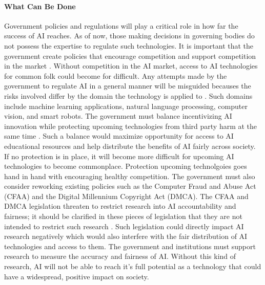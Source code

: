 \documentclass[12pt]{article}
\begin{document}
\paragraph{What Can Be Done\\}
Government policies and regulations will play a critical role in how far the success of AI reaches. As of now, those making decisions in governing bodies do not possess the expertise to regulate such technologies. It is important that the government create policies that encourage competition and support competition in the market \cite{gov}. Without competition in the AI market, access to AI technologies for common folk could become for difficult. Any attempts made by the government to regulate AI in a general manner will be misguided becauses the risks involved differ by the domain the technology is applied to \cite[pg. 48]{twentythirty}. Such domains include machine learning applications, natural language processing, computer vision, and smart robots. The government must balance incentivizing AI innovation while protecting upcoming technologies from third party harm at the same time \cite[pg. 47]{twentythirty}. Such a balance would maximize opportunity for access to AI educational resources and help distribute the benefits of AI fairly across society. If no protection is in place, it will become more difficult for upcoming AI technologies to become commonplace. Protection upcoming technolgoies goes hand in hand with encouraging healthy competition. The government must also consider reworking existing policies such as the Computer Fraud and Abuse Act (CFAA) and the Digital Millennium Copyright Act (DMCA). The CFAA and DMCA legislation threaten to restrict research into AI accountability and fairness; it should be clarified in these pieces of legislation that they are not intended to restrict such research \cite[pg. 4]{now}. Such legislation could directly impact AI research negatively which would also interfere with the fair distribution of AI technologies and access to them. The government and institutions must support research to measure the accuracy and fairness of AI. Without this kind of research, AI will not be able to reach it's full potential as a technology that could have a widespread, positive impact on society. 
\end{document}
